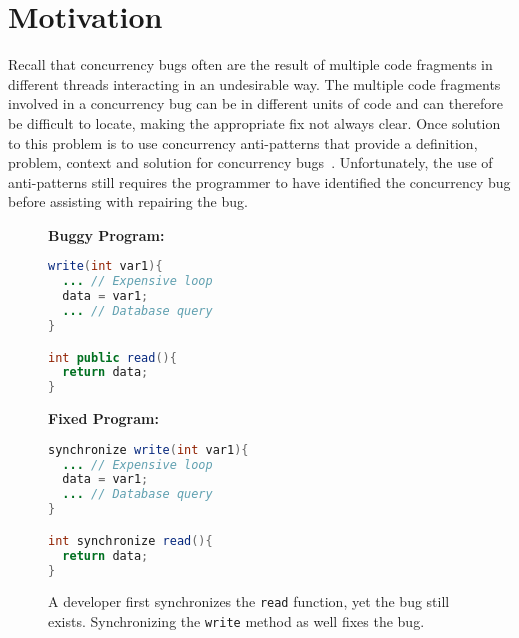\section{Motivation}
\label{sec:motivation}

Recall that concurrency bugs often are the result of multiple code fragments in different threads interacting in an undesirable way. The multiple code fragments involved in a concurrency bug can be
in different units of code and can therefore be difficult to locate, making the appropriate fix not
always clear. Once solution to this problem is to use concurrency anti-patterns that provide a
definition, problem, context and solution for concurrency
bugs~\cite{BJ09,FKLV12}. Unfortunately, the use of anti-patterns still requires the programmer to have identified the concurrency bug before assisting with repairing the bug.

\begin{figure}[t!]
\begin{minipage}{5cm}
\footnotesize{\textbf{Buggy Program:}}
\begin{lstlisting}[language=Java, morekeywords={synchronize}]
write(int var1){
  ... // Expensive loop
  data = var1;
  ... // Database query
}

int public read(){
  return data;
}
\end{lstlisting}
\end{minipage}\hfill
\begin{minipage}{5cm}
\footnotesize{\textbf{Fixed Program:}}
\begin{lstlisting}[language=Java, morekeywords={synchronize}]
synchronize write(int var1){
  ... // Expensive loop
  data = var1;
  ... // Database query
}

int synchronize read(){
  return data;
}
\end{lstlisting}
\end{minipage}
\caption{A developer first synchronizes the \texttt{read} function, yet the bug
still exists. Synchronizing the \texttt{write} method as well fixes the bug.}
\label{fig:fixed_sample_datarace}
\end{figure}

